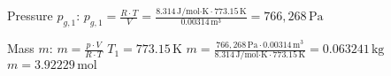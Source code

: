 Pressure \( p_{g,1} \):  
\( p_{g,1} = \frac{R \cdot T}{V} = \frac{8.314 \, \text{J/mol·K} \cdot 773.15 \, \text{K}}{0.00314 \, \text{m}^3} = 766,268 \, \text{Pa} \)  

Mass \( m \):  
\( m = \frac{p \cdot V}{R \cdot T} \)  
\( T_1 = 773.15 \, \text{K} \)  
\( m = \frac{766,268 \, \text{Pa} \cdot 0.00314 \, \text{m}^3}{8.314 \, \text{J/mol·K} \cdot 773.15 \, \text{K}} = 0.063241 \, \text{kg} \)  
\( m = 3.92229 \, \text{mol} \)